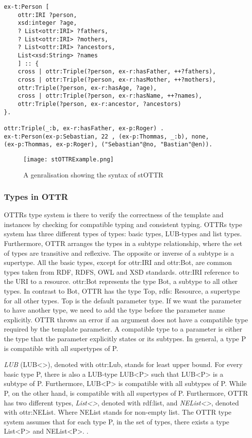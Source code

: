 \begin{lstlisting}[frame=single]
ex-t:Person [
    ottr:IRI ?person,
    xsd:integer ?age,
    ? List<ottr:IRI> ?fathers,
    ? List<ottr:IRI> ?mothers,
    ? List<ottr:IRI> ?ancestors,
    List<xsd:String> ?names
    ] :: {
    cross | ottr:Triple(?person, ex-r:hasFather, ++?fathers),
    cross | ottr:Triple(?person, ex-r:hasMother, ++?mothers),
    ottr:Triple(?person, ex-r:hasAge, ?age),
    cross | ottr:Triple(?person, ex-r:hasName, ++?names),
    ottr:Triple(?person, ex-r:ancestor, ?ancestors)
}.

ottr:Triple(_:b, ex-r:hasFather, ex-p:Roger) .
ex-t:Person(ex-p:Sebastian, 22 , (ex-p:Thommas, _:b), none, 
(ex-p:Thommas, ex-p:Roger), ("Sebastian"@no, "Bastian"@en)).
\end{lstlisting}

\begin{figure}
    \centering
    \texttt{[image: stOTTRExample.png]}
    \caption{A genralisation showing the syntax of stOTTR}
    \label{fig:stOTTERGenralisation}
\end{figure}

\subsubsection{Types in OTTR}
\label{ottr types} 
OTTRs type system is there to verify the correctness of the template and instances by checking for compatible typing and consistent typing. OTTRs type system has three different types of types: basic types, LUB-types and list types. Furthermore, OTTR arranges the types in a subtype relationship, where the set of types are transitive and reflexive. The opposite or inverse of a subtype is a supertype. All the basic types, except for ottr:IRI and ottr:Bot, are common types taken from RDF, RDFS, OWL and XSD standards. ottr:IRI reference to the URI to a resource. ottr:Bot represents the type Bot, a subtype to all other types. In contrast to Bot, OTTR has the type Top, rdfs: Resource, a supertype for all other types.  Top is the default parameter type. If we want the parameter to have another type, we need to add the type before the parameter name explicitly. OTTR throws an error if an argument does not have a compatible type required by the template parameter. A compatible type to a parameter is either the type that the parameter explicitly states or its subtypes. In general, a type P is compatible with all supertypes of P.

\para
\emph{LUB} (LUB<>), denoted with ottr:Lub, stands for least upper bound. For every basic type P, there is also a LUB-type LUB<P> such that LUB<P> is a subtype of P. Furthermore, LUB<P> is compatible with all subtypes of P. While P, on the other hand, is compatible with all supertypes of P. Furthermore, OTTR has two different types, \emph{List<>}, denoted with rdf:list, and \emph{NEList<>}, denoted with ottr:NEList. Where NEList stands for non-empty list. The OTTR type system assumes that for each type P, in the set of types, there exists a type List<P> and NEList<P>.  \autocite[5]{SLKK_OTTR_2021}.

